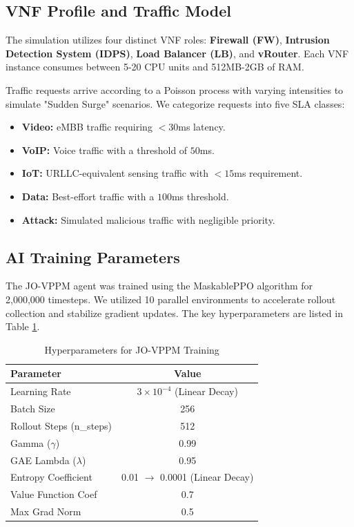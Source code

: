 \documentclass[12pt, a4paper, reqno, oneside]{book}
\begin{document}
\subsection{VNF Profile and Traffic Model}
The simulation utilizes four distinct VNF roles: \textbf{Firewall (FW)}, \textbf{Intrusion Detection System (IDPS)}, \textbf{Load Balancer (LB)}, and \textbf{vRouter}. Each VNF instance consumes between 5-20 CPU units and 512MB-2GB of RAM.

Traffic requests arrive according to a Poisson process with varying intensities to simulate "Sudden Surge" scenarios. We categorize requests into five SLA classes:
\begin{itemize}
    \item \textbf{Video:} eMBB traffic requiring $<30$ms latency.
    \item \textbf{VoIP:} Voice traffic with a threshold of $50$ms.
    \item \textbf{IoT:} URLLC-equivalent sensing traffic with $<15$ms requirement.
    \item \textbf{Data:} Best-effort traffic with a $100$ms threshold.
    \item \textbf{Attack:} Simulated malicious traffic with negligible priority.
\end{itemize}

\subsection{AI Training Parameters}
The JO-VPPM agent was trained using the MaskablePPO algorithm for 2,000,000 timesteps. We utilized 10 parallel environments to accelerate rollout collection and stabilize gradient updates. The key hyperparameters are listed in Table \ref{table:hyperparams}.

\begin{table}[H]
\centering
\caption{Hyperparameters for JO-VPPM Training}
\label{table:hyperparams}
\begin{tabular}{lc}
\toprule
\textbf{Parameter} & \textbf{Value} \\
\midrule
Learning Rate & $3 \times 10^{-4}$ (Linear Decay) \\
Batch Size & 256 \\
Rollout Steps (n\_steps) & 512 \\
Gamma ($\gamma$) & 0.99 \\
GAE Lambda ($\lambda$) & 0.95 \\
Entropy Coefficient & 0.01 $\to$ 0.0001 (Linear Decay) \\
Value Function Coef & 0.7 \\
Max Grad Norm & 0.5 \\
\bottomrule
\end{tabular}
\end{table}
\end{document}
